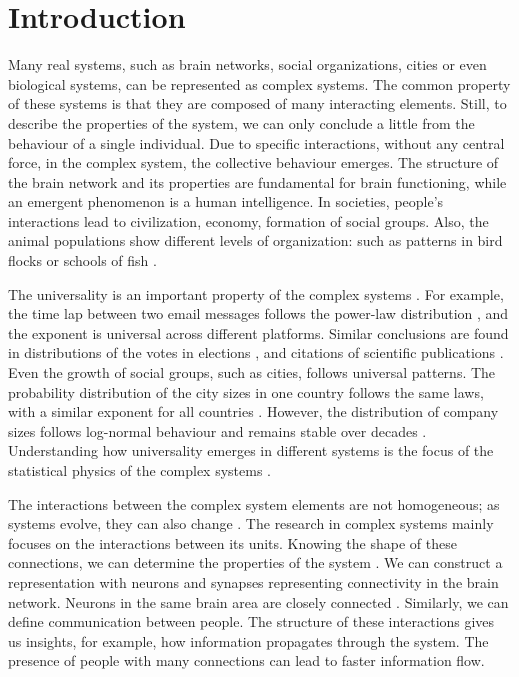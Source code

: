 \chapter{Introduction} %

Many real systems, such as brain networks, social organizations, cities or even biological systems, can be represented as complex systems. The common property of these systems is that they are composed of many interacting elements. Still, to describe the properties of the system, we can only conclude a little from the behaviour of a single individual. Due to specific interactions, without any central force, in the complex system, the collective behaviour \cite{kwapien2012} emerges. The structure of the brain network and its properties are fundamental for brain functioning, while an emergent phenomenon is a human intelligence. In societies, people's interactions lead to civilization, economy, formation of social groups. Also, the animal populations show different levels of organization: such as patterns in bird flocks or schools of fish \cite{thurner2018}.

The universality is an important property of the complex systems  \cite{binney1992}. For example, the time lap between two email messages follows the power-law distribution \cite{garas2012emotional}, and the exponent is universal across different platforms. Similar conclusions are found in distributions of the votes in elections \cite{fortunato2007scaling, chatterjee2013}, and citations of scientific publications \cite{radicchi2008}. Even the growth of social groups, such as cities, follows universal patterns. The probability distribution of the city sizes in one country follows the same laws, with a similar exponent for all countries \cite{barthelemy2019, fazio2015pareto}. However, the distribution of company sizes follows log-normal behaviour and remains stable over decades \cite{amaral1997scaling, stanley1996scaling}. Understanding how universality emerges in different systems is the focus of the statistical physics of the complex systems \cite{verbavatz2020}. 

The interactions between the complex system elements are not homogeneous; as systems evolve, they can also change \cite{thurner2018}. The research in complex systems mainly focuses on the interactions between its units. Knowing the shape of these connections, we can determine the properties of the system \cite{ladyman2013}. We can construct a representation with neurons and synapses representing connectivity in the brain network. Neurons in the same brain area are closely connected \cite{latora2017complex}.
Similarly, we can define communication between people. The structure of these interactions gives us insights, for example, how information propagates through the system. The presence of people with many connections can lead to faster information flow. 

